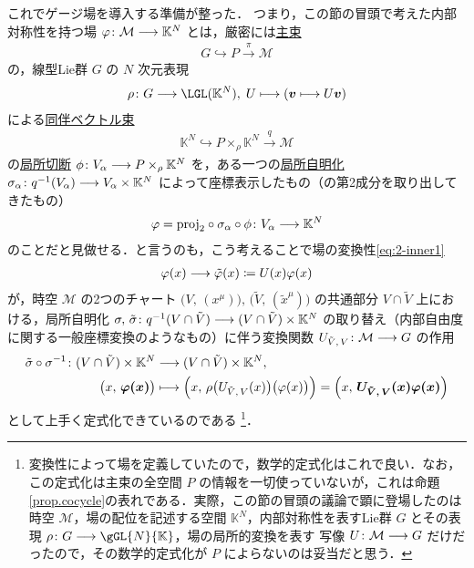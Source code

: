 \documentclass[TQFT_main]{subfiles}
\begin{document}
これでゲージ場を導入する準備が整った．
つまり，この節の冒頭で考えた内部対称性を持つ場 $\varphi \colon \mathcal{M} \longrightarrow \mathbb{K}^N$ とは，厳密には\hyperref[def.PFD]{主束}
\begin{align}
    G \hookrightarrow P \xrightarrow{\pi} \mathcal{M}
\end{align}
の，線型Lie群 $G$ の $N$ 次元表現
\begin{align}
    \rho \colon G \lto \LGL (\mathbb{K}^N),\; U \lmto (\bm{v} \lmto U\bm{v})
\end{align}
による\hyperref[def:associated-vect]{同伴ベクトル束}
\begin{align}
    \mathbb{K}^N \hookrightarrow P \times_\rho \mathbb{K}^N \xrightarrow{q} \mathcal{M}
\end{align}
の\hyperref[def.section]{局所切断} $\phi \colon V_\alpha \longrightarrow P \times_\rho \mathbb{K}^N$ を，ある一つの\hyperref[def.fiber-1]{局所自明化} $\sigma_\alpha \colon q^{-1}(V_\alpha) \longrightarrow V_\alpha \times \mathbb{K}^N$ によって座標表示したもの（の第2成分を取り出してきたもの）
\begin{align}
    \varphi = \mathrm{proj}_2 \circ \sigma_\alpha \circ \phi \colon V_\alpha \longrightarrow \mathbb{K}^N
\end{align}
のことだと見做せる．と言うのも，こう考えることで場の変換性\eqref{eq:2-inner1}
\begin{align}
    \varphi(x) \longrightarrow \tilde{\varphi}(x) \coloneqq U(x) \varphi (x)
\end{align}
が，時空 $\mathcal{M}$ の2つのチャート $\bigl(V,\, (x^\mu)\bigr),\, \bigl(\tilde{V},\, (\tilde{x}^\mu)\bigr)$ の共通部分 $V \cap \tilde{V}$ 上における，局所自明化 $\sigma,\, \tilde{\sigma} \colon q^{-1} (V \cap \tilde{V}) \longrightarrow (V \cap \tilde{V}) \times \mathbb{K}^N$ の取り替え（内部自由度に関する一般座標変換のようなもの）に伴う変換関数 $U_{\tilde{V},\, V} \colon \mathcal{M} \longrightarrow G$ の作用
\begin{align}
    \tilde{\sigma} \circ \sigma^{-1} \colon (V \cap \tilde{V}) \times \mathbb{K}^N &\longrightarrow (V \cap \tilde{V}) \times \mathbb{K}^N, \\
    \bigl(x,\, \bm{\varphi(x)}\bigr) &\longmapsto \Bigl(x,\, \rho\bigl(U_{\tilde{V},\, V}(x)\bigr)\bigl( \varphi(x) \bigr) \Bigr) = \Bigl( x,\, \bm{U_{\tilde{V},\, V} (x) \varphi(x)} \Bigr) 
\end{align}
として上手く定式化できているのである
\footnote{
    変換性によって場を定義していたので，数学的定式化はこれで良い．なお，この定式化は主束の全空間 $P$ の情報を一切使っていないが，これは命題\ref{prop.cocycle}の表れである．実際，この節の冒頭の議論で顕に登場したのは時空 $\mathcal{M}$，場の配位を記述する空間 $\mathbb{K}^N$，内部対称性を表すLie群 $G$ とその表現 $\rho \colon G \lto \gGL{N}{\mathbb{K}}$，場の局所的変換を表す \cinfty 写像 $U \colon \mathcal{M} \longrightarrow G$ だけだったので，その数学的定式化が $P$ によらないのは妥当だと思う．
}．
\end{document}
